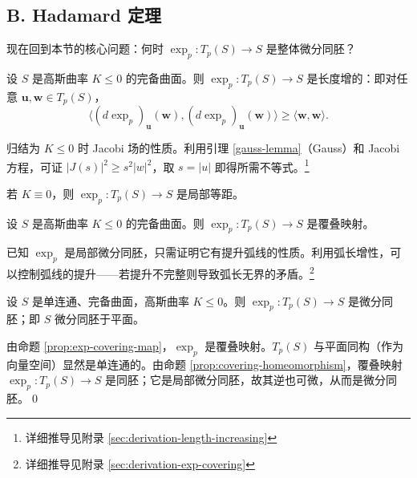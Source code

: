 \subsection*{B. Hadamard 定理}

现在回到本节的核心问题：何时 $\exp_p: T_p(S) \to S$ 是整体微分同胚？

\begin{Lemma}\label{length-increasing}
设 $S$ 是高斯曲率 $K \leq 0$ 的完备曲面。则 $\exp_p: T_p(S) \to S$ 是长度增的：即对任意 $\mathbf{u}, \mathbf{w} \in T_p(S)$，
\[
\langle (d\exp_p)_\mathbf{u}(\mathbf{w}), (d\exp_p)_\mathbf{u}(\mathbf{w})\rangle \geq \langle \mathbf{w}, \mathbf{w}\rangle.
\]
\end{Lemma}

\begin{Proof}[证明概要]
归结为 $K \leq 0$ 时 Jacobi 场的性质。利用引理 \ref{gauss-lemma}（Gauss）和 Jacobi 方程，可证 $|J(s)|^2 \geq s^2|w|^2$，取 $s=|u|$ 即得所需不等式。\footnote{详细推导见附录 \cref{sec:derivation-length-increasing}}
\end{Proof}

\begin{Corollary}
若 $K \equiv 0$，则 $\exp_p: T_p(S) \to S$ 是局部等距。
\end{Corollary}

\begin{Proposition}\label{prop:exp-covering-map}
设 $S$ 是高斯曲率 $K \leq 0$ 的完备曲面。则 $\exp_p: T_p(S) \to S$ 是覆叠映射。
\end{Proposition}

\begin{Proof}
已知 $\exp_p$ 是局部微分同胚，只需证明它有提升弧线的性质。利用弧长增性，可以控制弧线的提升——若提升不完整则导致弧长无界的矛盾。\footnote{详细推导见附录 \cref{sec:derivation-exp-covering}}
\end{Proof}

\begin{Theorem}\label{hadamard-first}
设 $S$ 是单连通、完备曲面，高斯曲率 $K \leq 0$。则 $\exp_p: T_p(S) \to S$ 是微分同胚；即 $S$ 微分同胚于平面。
\end{Theorem}

\begin{Proof}
由命题 \ref{prop:exp-covering-map}，$\exp_p$ 是覆叠映射。$T_p(S)$ 与平面同构（作为向量空间）显然是单连通的。由命题 \ref{prop:covering-homeomorphism}，覆叠映射 $\exp_p: T_p(S) \to S$ 是同胚；它是局部微分同胚，故其逆也可微，从而是微分同胚。\qed
\end{Proof}

